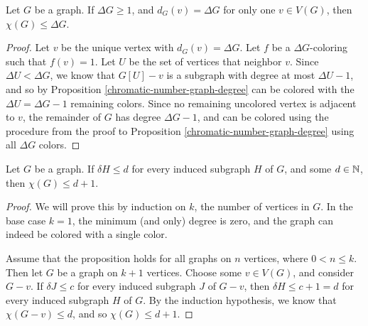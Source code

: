 \begin{prop}\label{single-maximum-degree}
    Let $G$ be a graph. If $\Delta G \geq 1$, and $d_G(v) = \Delta G$ for only one $v \in V(G)$, then $\chi(G) \leq \Delta G$.
\end{prop}

\begin{proof}
    Let $v$ be the unique vertex with $d_G(v) = \Delta G$. Let $f$ be a $\Delta G$-coloring such that $f(v) = 1$. Let $U$ be the set of vertices that neighbor $v$. Since $\Delta U < \Delta G$, we know that $G[U] - v$ is a subgraph with degree at most $\Delta U - 1$, and so by Proposition \ref{chromatic-number-graph-degree} can be colored with the $\Delta U = \Delta G - 1$ remaining colors. Since no remaining uncolored vertex is adjacent to $v$, the remainder of $G$ has degree $\Delta G - 1$, and can be colored using the procedure from the proof to Proposition \ref{chromatic-number-graph-degree} using all $\Delta G$ colors.
\end{proof}

\begin{prop}\label{induced-subgraphs-minimum-degree}
    Let $G$ be a graph. If $\delta H \leq d$ for every induced subgraph $H$ of $G$, and some $d \in \mathbb{N}$, then $\chi(G) \leq d+1$.
\end{prop}

\begin{proof}
    We will prove this by induction on $k$, the number of vertices in $G$. In the base case $k=1$, the minimum (and only) degree is zero, and the graph can indeed be colored with a single color.

    Assume that the proposition holds for all graphs on $n$ vertices, where $0 < n \leq k$. Then let $G$ be a graph on $k+1$ vertices. Choose some $v \in V(G)$, and consider $G - v$. If $\delta J \leq c$ for every induced subgraph $J$ of $G - v$, then $\delta H \leq c +1 = d$ for every induced subgraph $H$ of $G$. By the induction hypothesis, we know that $\chi(G - v) \leq d$, and so $\chi(G) \leq d+1$.
\end{proof}


